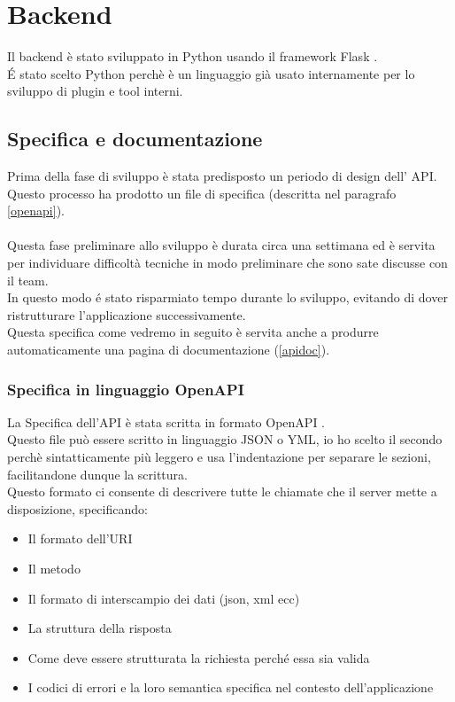 \chapter{Backend}
        Il backend è stato sviluppato in Python \cite{Python} usando il framework Flask \cite{Flask}.\\
        \'E stato scelto Python perchè è un linguaggio già usato internamente per lo sviluppo di plugin e tool interni.

        \section{Specifica e documentazione}
            Prima della fase di sviluppo è stata predisposto un periodo di design dell' API.\\
            Questo processo ha prodotto un file di specifica (descritta nel paragrafo 
            \ref{openapi}).\\\\
            Questa fase preliminare allo sviluppo è durata circa una settimana ed è servita per 
            individuare difficoltà tecniche in modo preliminare che sono sate discusse con il team.\\
            In questo modo \'e stato risparmiato tempo durante lo sviluppo, evitando di dover ristrutturare l'applicazione successivamente.\\
            Questa specifica come vedremo in seguito è servita anche a produrre automaticamente una pagina di documentazione (\ref{apidoc}).
            
            \subsection{Specifica in linguaggio OpenAPI\label{openapi}}
                La Specifica dell'API è stata scritta in formato OpenAPI \cite{OpenAPI}.\\
                Questo file può essere scritto in linguaggio JSON o YML, io ho scelto il secondo perchè
                sintatticamente più leggero e usa l'indentazione per separare le sezioni, facilitandone dunque la scrittura. \\
                Questo formato ci consente di descrivere tutte le chiamate che il server 
                mette a disposizione, specificando:
                \begin{itemize}
                    \item Il formato dell'URI 
                    \item Il metodo
                    \item Il formato di interscampio dei dati (json, xml ecc) 
                    \item La struttura della risposta
                    \item Come deve essere strutturata la richiesta perch\'e essa sia valida
                    \item I codici di errori e la loro semantica specifica nel contesto dell'applicazione
                \end{itemize}
                

